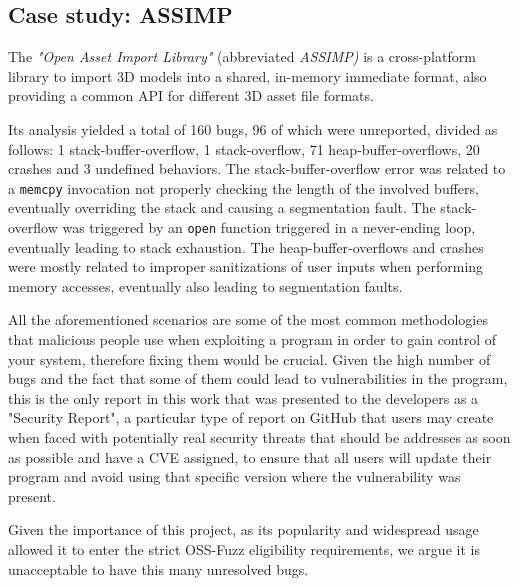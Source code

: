 \newpage
\subsection{Case study: ASSIMP}
The \textit{"Open Asset Import Library"} (abbreviated \textit{ASSIMP)} \cite{assimp} is a cross-platform library to import 3D models into a shared, in-memory immediate format, also providing a common API for different 3D asset file formats.

Its analysis yielded a total of 160 bugs, 96 of which were unreported, divided as follows: 1 stack-buffer-overflow, 1 stack-overflow, 71 heap-buffer-overflows, 20 crashes and 3 undefined behaviors. The stack-buffer-overflow error was related to a \verb|memcpy| invocation not properly checking the length of the involved buffers, eventually overriding the stack and causing a segmentation fault. The stack-overflow was triggered by an \verb|open| function triggered in a never-ending loop, eventually leading to stack exhaustion. The heap-buffer-overflows and crashes were mostly related to improper sanitizations of user inputs when performing memory accesses, eventually also leading to segmentation faults.


All the aforementioned scenarios are some of the most common methodologies that malicious people use when exploiting a program in order to gain control of your system, therefore fixing them would be crucial. Given the high number of bugs and the fact that some of them could lead to vulnerabilities in the program, this is the only report in this work that was presented to the developers as a "Security Report", a particular type of report on GitHub that users may create when faced with potentially real security threats that should be addresses as soon as possible and have a CVE assigned, to ensure that all users will update their program and avoid using that specific version where the vulnerability was present.


Given the importance of this project, as its popularity and widespread usage allowed it to enter the strict OSS-Fuzz eligibility requirements, we argue it is unacceptable to have this many unresolved bugs.


